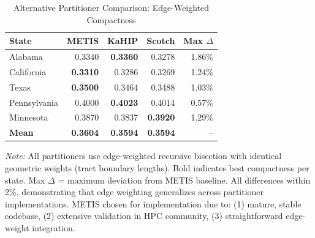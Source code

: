\begin{table}[t]
\caption{Alternative Partitioner Comparison: Edge-Weighted Compactness}
\label{tab:partitioner-comparison}
\centering
\small
\begin{tabular}{@{}lrrrr@{}}
\toprule
\textbf{State} & \textbf{METIS} & \textbf{KaHIP} & \textbf{Scotch} & \textbf{Max $\Delta$} \\
\midrule
Alabama & 0.3340 & \textbf{0.3360} & 0.3278 & 1.86\% \\
California & \textbf{0.3310} & 0.3286 & 0.3269 & 1.24\% \\
Texas & \textbf{0.3500} & 0.3464 & 0.3488 & 1.03\% \\
Pennsylvania & 0.4000 & \textbf{0.4023} & 0.4014 & 0.57\% \\
Minnesota & 0.3870 & 0.3837 & \textbf{0.3920} & 1.29\% \\
\midrule
\textbf{Mean} & \textbf{0.3604} & \textbf{0.3594} & \textbf{0.3594} & -- \\
\bottomrule
\end{tabular}
\vspace{0.5em}

\footnotesize
\textit{Note:} All partitioners use edge-weighted recursive bisection with identical
geometric weights (tract boundary lengths). Bold indicates best compactness per state.
Max $\Delta$ = maximum deviation from METIS baseline. All differences within 2\%,
demonstrating that edge weighting generalizes across partitioner implementations.
METIS chosen for implementation due to: (1) mature, stable codebase, (2) extensive
validation in HPC community, (3) straightforward edge-weight integration.
\end{table}
